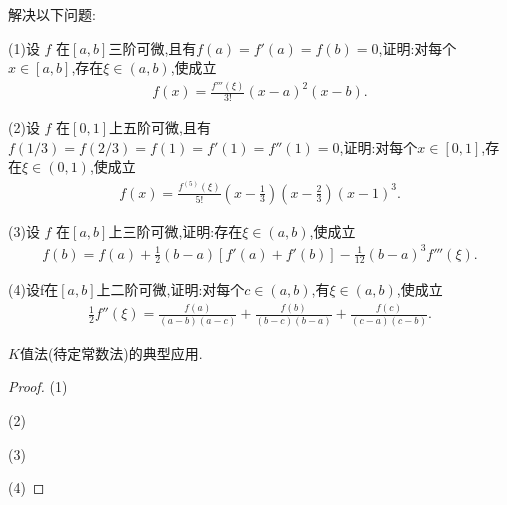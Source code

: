 \documentclass[lang=cn,newtx,10pt,scheme=chinese]{elegantbook}
\begin{document}
\begin{exercise}
解决以下问题:

(1)设 \( f \) 在\([a, b]\)三阶可微,且有\( f(a) = f'(a) = f(b) = 0\),证明:对每个\( x \in [a, b]\),存在\( \xi \in (a, b)\),使成立
\begin{align}
   f(x) = \frac{f'''(\xi)}{3!}(x - a)^2(x - b)
   .\nonumber
\end{align}

(2)设 \( f \) 在\([0, 1]\)上五阶可微,且有\( f(1/3) = f(2/3) = f(1) = f'(1) = f''(1) = 0\),证明:对每个\( x \in [0, 1]\),存在\( \xi \in (0, 1)\),使成立
\begin{align}
   f(x) = \frac{f^{(5)}(\xi)}{5!}\left(x - \frac{1}{3}\right)\left(x - \frac{2}{3}\right)(x - 1)^3
   .\nonumber
\end{align}

(3)设 \( f \) 在\([a, b]\)上三阶可微,证明:存在\( \xi \in (a, b)\),使成立
\begin{align}
   f(b) = f(a) + \frac{1}{2}(b - a)[f'(a) + f'(b)] - \frac{1}{12}(b - a)^3f'''(\xi)
   .\nonumber
\end{align}

(4)设f在$[a,b]$上二阶可微,证明:对每个$c\in(a,b)$,有$\xi\in(a,b)$,使成立
\begin{align}
    \frac{1}{2}f''(\xi)=\frac{f(a)}{(a-b)(a-c)}+\frac{f(b)}{(b-c)(b-a)}+\frac{f(c)}{(c-a)(c-b)}.
    \nonumber
\end{align}
\end{exercise}
\begin{note}
    $K$值法(待定常数法)的典型应用.
\end{note}
\begin{proof}
        (1)

        (2)

        (3)

        (4)
\end{proof}
\end{document}
